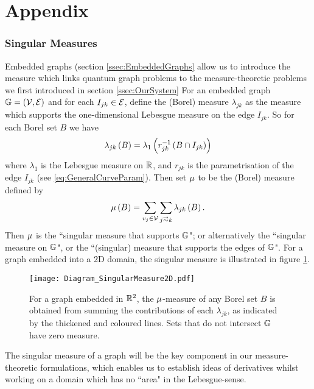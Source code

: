 \section{Appendix} \label{sec:Appendix}

\subsubsection{Singular Measures} \label{ssec:SingularMeasures}
Embedded graphs (section \ref{ssec:EmbeddedGraphs} allow us to introduce the measure which links quantum graph problems to the measure-theoretic problems we first introduced in section \ref{ssec:OurSystem}
For an embedded graph $\mathbb{G} = \left( \mathcal{V},\mathcal{E} \right)$ and for each $I_{jk}\in \mathcal{E}$, define the (Borel) measure $\lambda_{jk}$ as the measure which supports the one-dimensional Lebesgue measure on the edge $I_{jk}$.
So for each Borel set $B$ we have
\begin{align*}
	\lambda_{jk}\left( B \right) = \lambda_{1}\left( r_{jk}^{-1}\left( B \cap I_{jk} \right) \right)
\end{align*}
where $\lambda_1$ is the Lebesgue measure on $\mathbb{R}$, and $r_{jk}$ is the parametrisation of the edge $I_{jk}$ (see \eqref{eq:GeneralCurveParam}).
Then set $\mu$ to be the (Borel) measure defined by
\begin{align*}
	\ddmes\bracs{B} = \sum_{v_j\in \vertSet}\sum_{j\conLeft k} \lambda_{jk}\bracs{B}.
\end{align*}
Then $\mu$ is the ``singular measure that supports $\mathbb{G}$"; or alternatively the ``singular measure on $\mathbb{G}$", or the ``(singular) measure that supports the edges of $\mathbb{G}$". 
For a graph embedded into a 2D domain, the singular measure is illustrated in figure \ref{fig:Diagram_SingularMeasure2D}.
\begin{figure}[b!]
	\centering
	\texttt{[image: Diagram\_SingularMeasure2D.pdf]}
	\caption{\label{fig:Diagram_SingularMeasure2D} For a graph embedded in $\mathbb{R}^2$, the $\mu$-measure of any Borel set $B$ is obtained from summing the contributions of each $\lambda_{jk}$, as indicated by the thickened and coloured lines.
	Sets that do not intersect $\mathbb{G}$ have zero measure.}
\end{figure} \newline
The singular measure of a graph will be the key component in our measure-theoretic formulations, which enables us to establish ideas of derivatives whilst working on a domain which has no ``area" in the Lebesgue-sense.

